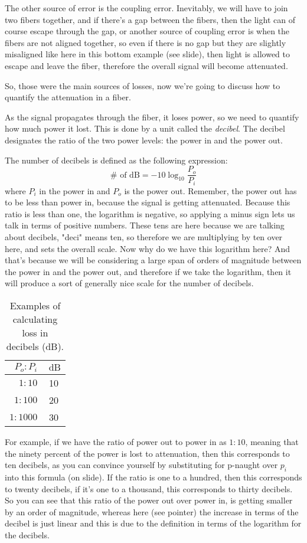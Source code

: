 The other source of error is the coupling error. Inevitably, we will have to join two fibers together, and if there's a gap between the fibers, then the light can of course escape through the gap, or another source of coupling error is when the fibers are not aligned together, so even if there is no gap but they are slightly misaligned like here in this bottom example (see slide), then light is allowed to escape and leave the fiber, therefore the overall signal will become attenuated.

So, those were the main sources of losses, now we're going to discuss how to quantify the attenuation in a fiber.

As the signal propagates through the fiber, it loses power, so we need to quantify how much power it lost. This is done by a unit called the \emph{decibel}. The decibel designates the ratio of the two power levels: the power in and the power out.

The number of decibels is defined as the following expression:
\begin{equation}
\# \text { of } \mathrm{dB}=-10 \log _{10} \frac{P_o}{P_i}
\end{equation}
where $P_i$ in the power in and $P_o$ is the power out. Remember, the power out has to be less than power in, because the signal is getting attenuated.  Because this ratio is less than one, the logarithm is negative, so applying a minus sign lets us talk in terms of positive numbers. These tens are here because we are talking about decibels, "deci" means ten, so therefore we are multiplying by ten over here, and sets the overall scale. Now why do we have this logarithm here? And that's because we will be considering a large span of orders of magnitude between the power in and the power out, and therefore if we take the logarithm, then it will produce a sort of generally nice scale for the number of decibels.
\begin{table}
\begin{tabular}{r|c}
$P_o: P_i$ & $\mathrm{~dB}$ \\
\hline $1: 10$ & 10 \\
$1: 100$ & 20 \\
$1: 1000$ & 30
\end{tabular}
\caption{Examples of calculating loss in decibels (dB).}
\label{tab:decibels}
\end{table}

For example, if we have the ratio of power out to power in as $1:10$, meaning that the ninety percent of the power is lost to attenuation, then this corresponds to ten decibels, as you can convince yourself by substituting for p-naught over $p_i$ into this formula (on slide). If the ratio is one to a hundred, then this corresponds to twenty decibels, if it's one to a thousand, this corresponds to thirty decibels. So you can see that this ratio of the power out over power in, is getting smaller by an order of magnitude, whereas here (see pointer) the increase in terms of the decibel is just linear and this is due to the definition in terms of the logarithm for the decibels.

